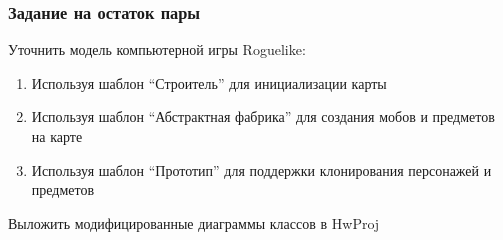 \documentclass{../../slides-style}
\begin{document}
    \begin{frame}
        \frametitle{Задание на остаток пары}
        Уточнить модель компьютерной игры Roguelike:

        \begin{enumerate}
            \item Используя шаблон ``Строитель'' для инициализации карты
            \item Используя шаблон ``Абстрактная фабрика'' для создания мобов и предметов на карте
            \item Используя шаблон ``Прототип'' для поддержки клонирования персонажей и предметов
        \end{enumerate}

        Выложить модифицированные диаграммы классов в HwProj
    \end{frame}
\end{document}
